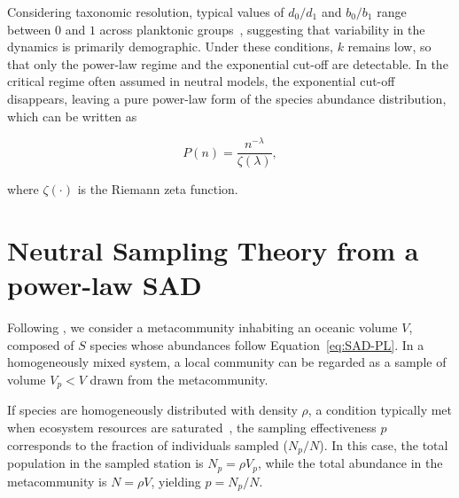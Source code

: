\documentclass[%
 preprint,            %
 superscriptaddress, %
 amsmath,amssymb,    %
 aps,                %
 pra,                %
 floatfix,           %
]{revtex4-2}
\begin{document}
Considering taxonomic resolution, typical values of $d_0/d_1$ and $b_0/b_1$ range between $0$ and $1$ across planktonic groups~\cite{sergiacomi2018ubiquitous}, suggesting that variability in the dynamics is primarily demographic. Under these conditions, $k$ remains low, so that only the power-law regime and the exponential cut-off are detectable. In the critical regime often assumed in neutral models, the exponential cut-off disappears, leaving a pure power-law form of the species abundance distribution, which can be written as

\begin{equation}
P(n) = \frac{n^{-\lambda}}{\zeta(\lambda)} , \label{eq:SAD-PL}
\end{equation}

where $\zeta(\cdot)$ is the Riemann zeta function.

\section{Neutral Sampling Theory from a power-law SAD}

Following \cite{pigani2024deviation}, we consider a metacommunity inhabiting an oceanic volume $V$, composed of $S$ species whose abundances follow Equation~\eqref{eq:SAD-PL}. In a homogeneously mixed system, a local community can be regarded as a sample of volume $V_p < V$ drawn from the metacommunity.

If species are homogeneously distributed with density $\rho$, a condition typically met when ecosystem resources are saturated~\cite{hubbel2001book}, the sampling effectiveness $p$ corresponds to the fraction of individuals sampled ($N_p/N$). In this case, the total population in the sampled station is $N_p = \rho V_p$, while the total abundance in the metacommunity is $N = \rho V$, yielding $p = N_p/N$.
\end{document}
